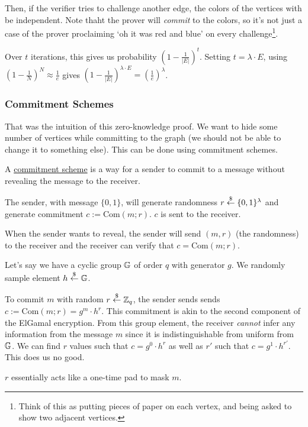 Then, if the verifier tries to challenge another edge, the colors of the vertices with be independent. Note thaht the prover will \emph{commit} to the colors, so it's not just a case of the prover proclaiming `oh it was red and blue' on every challenge\footnote{Think of this as putting pieces of paper on each vertex, and being asked to show two adjacent vertices.}.

Over $t$ iterations, this gives us probability $\left( 1 - \frac{1}{|E|} \right)^t$. Setting $t = \lambda\cdot E$, using $\left( 1 - \frac{1}{N} \right)^N\approx \frac{1}{e}$ gives $\left( 1 - \frac{1}{|E|} \right)^{\lambda\cdot E} = \left( \frac{1}{e} \right)^\lambda$.

\subsubsection{Commitment Schemes}
That was the intuition of this zero-knowledge proof. We want to hide some number of vertices while committing to the graph (we should not be able to change it to something else). This can be done using commitment schemes.

\begin{definition}
    A \ul{commitment scheme} is a way for a sender to commit to a message without revealing the message to the receiver.

    The sender, with message $\{0, 1\}$, will generate randomness $r\overset{\$}{\leftarrow} \{0, 1\}^\lambda$ and generate commitment $c := \mathrm{Com}(m;r)$. $c$ is sent to the receiver.

    When the sender wants to reveal, the sender will send $(m, r)$ (the randomness) to the receiver and the receiver can verify that $c = \mathrm{Com}(m;r)$.


\end{definition}

\begin{example}
    Let's say we have a cyclic group $\mathbb G$ of order $q$ with generator $g$. We randomly sample element $h\overset{\$}{\leftarrow} \mathbb G$.

    To commit $m$ with random $r\overset{\$}{\leftarrow} \mathbb Z_q$, the sender sends sends $c := \mathrm{Com}(m;r) = g^m\cdot h^r$. This commitment is akin to the second component of the ElGamal encryption. From this group element, the receiver \emph{cannot} infer any information from the message $m$ since it is indistinguishable from uniform from $\mathbb G$. We can find $r$ values such that $c = g^0\cdot h^r$ as well as $r'$ such that $c = g^1\cdot h^{r'}$. This does us no good.

    $r$ essentially acts like a one-time pad to mask $m$.
\end{example}

